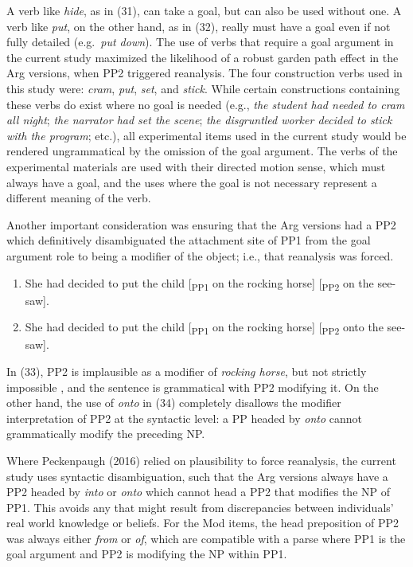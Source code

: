 \documentclass[12pt,oneside]{book}
\providecommand{\tightlist}{%
  \setlength{\itemsep}{0pt}\setlength{\parskip}{0pt}}
\begin{document}
A verb like \emph{hide}, as in (31), can take a goal, but can also be used without one. A verb like \emph{put}, on the other hand, as in (32), really must have a goal even if not fully detailed (e.g.~\emph{put down}). The use of verbs that require a goal argument in the current study maximized the likelihood of a robust garden path effect in the Arg versions, when PP2 triggered reanalysis. The four construction verbs used in this study were: \emph{cram}, \emph{put}, \emph{set}, and \emph{stick}. While certain constructions containing these verbs do exist where no goal is needed (e.g., \emph{the student had needed to cram all night}; \emph{the narrator had set the scene}; \emph{the disgruntled worker decided to stick with the program}; etc.), all experimental items used in the current study would be rendered ungrammatical by the omission of the goal argument. The verbs of the experimental materials are used with their directed motion sense, which must always have a goal, and the uses where the goal is not necessary represent a different meaning of the verb.

Another important consideration was ensuring that the Arg versions had a PP2 which definitively disambiguated the attachment site of PP1 from the goal argument role to being a modifier of the object; i.e., that reanalysis was forced.

\begin{enumerate}
\def\labelenumi{(\arabic{enumi})}
\setcounter{enumi}{32}
\tightlist
\item
  She had decided to put the child {[}\textsubscript{PP1} on the rocking horse{]} {[}\textsubscript{PP2} on the see-saw{]}.
\item
  She had decided to put the child {[}\textsubscript{PP1} on the rocking horse{]} {[}\textsubscript{PP2} onto the see-saw{]}.
\end{enumerate}

In (33), PP2 is implausible as a modifier of \emph{rocking horse}, but not strictly impossible , and the sentence is grammatical with PP2 modifying it. On the other hand, the use of \emph{onto} in (34) completely disallows the modifier interpretation of PP2 at the syntactic level: a PP headed by \emph{onto} cannot grammatically modify the preceding NP.

Where Peckenpaugh (2016) relied on plausibility to force reanalysis, the current study uses syntactic disambiguation, such that the Arg versions always have a PP2 headed by \emph{into} or \emph{onto} which cannot head a PP2 that modifies the NP of PP1. This avoids any  that might result from discrepancies between individuals' real world knowledge or beliefs. For the Mod items, the head preposition of PP2 was always either \emph{from} or \emph{of}, which are compatible with a parse where PP1 is the goal argument and PP2 is modifying the NP within PP1.
\end{document}
